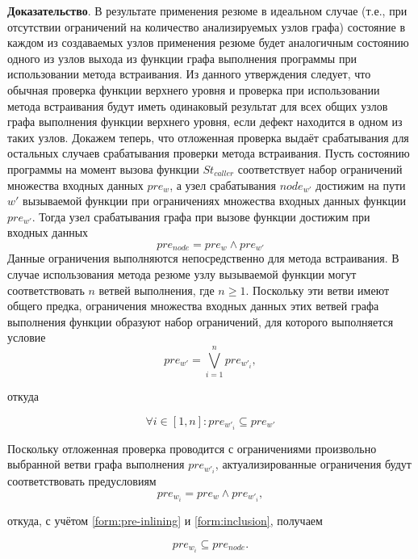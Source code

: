 \textbf{Доказательство}. В результате применения резюме в идеальном случае (т.е., при отсутствии ограничений на количество анализируемых узлов графа) состояние в каждом из создаваемых узлов применения резюме будет аналогичным состоянию одного из узлов выхода из функции графа выполнения программы при использовании метода встраивания. Из данного утверждения следует, что обычная проверка функции верхнего уровня и проверка при использовании метода встраивания будут иметь одинаковый результат для всех общих узлов графа выполнения функции верхнего уровня, если дефект находится в одном из таких узлов. Докажем теперь, что отложенная проверка выдаёт срабатывания для остальных случаев срабатывания проверки метода встраивания. Пусть состоянию программы на момент вызова функции $St_{caller}$ соответствует набор ограничений множества входных данных $pre_w$, а узел срабатывания $node_{w'}$ достижим на пути $w'$ вызываемой функции при ограничениях множества входных данных функции $pre_{w'}$. Тогда узел срабатывания графа при вызове функции достижим при входных данных 
\begin{equation}
 \label{form:pre-inlining}
 pre_{node} = pre_w \wedge pre_{w'}
\end{equation}
Данные ограничения выполняются непосредственно для метода встраивания. В случае использования метода резюме узлу вызываемой функции могут соответствовать $n$ ветвей выполнения, где $n \geqslant 1$. Поскольку эти ветви имеют общего предка, ограничения множества входных данных этих ветвей графа выполнения функции образуют набор ограничений, для которого выполняется условие 
\begin{equation}
 pre_{w'} = \bigvee_{i = 1}^n pre_{w'_i},
\end{equation}

откуда

\begin{equation}
\label{form:inclusion}
 \forall i \in [1, n]: pre_{w'_i} \subseteq pre_{w'}
\end{equation}

Поскольку отложенная проверка проводится с ограничениями произвольно выбранной ветви графа выполнения $pre_{w'_i}$, актуализированные ограничения будут соответствовать предусловиям 
\begin{equation}
 pre_{w_i} = pre_w \wedge pre_{w'_i},
\end{equation}

откуда, с учётом \ref{form:pre-inlining} и \ref{form:inclusion}, получаем

\begin{equation}
\label{form:total-inclusion}
 pre_{w_i} \subseteq pre_{node}.
\end{equation}

